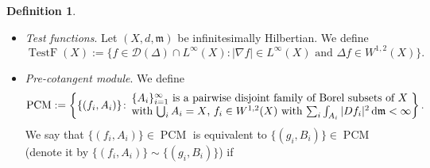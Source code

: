 \documentclass[pdftex]{sigma}
\numberwithin{equation}{section}
\theoremstyle{definition}
\newtheorem{Def}[Thm]{Definition}
\newcommand{\PCM}{\operatorname{PCM}}
\newcommand{\TestF}{\operatorname{TestF}}
\newcommand{\Ch}{\operatorname{Ch}}
\newcommand{\R}{\mathbb{R}}
\newcommand{\mf}{\mathfrak{m}}
\newcommand{\D}{\mathcal{D}}
\begin{document}
\begin{Def}
\begin{itemize}
\begin{itemize}
\[
\int_X g P_t f\,{\rm d}\mf=\int_X f P_t g\,{\rm d}\mf
\]
for any $f,g\in L^2(X)$.
\item For each $s,t>0$, we have $P_{s+t}=P_s\circ P_t$.
\item For each $f\in \D(\Delta)$ and $s>0$, we have that
\[
\lim_{t\to 0+} \frac{P_t f-f}{t}=\Delta f
\]
in $L^2(X)$ and that $\Delta P_s f =P_s \Delta f$.
\item For each $t>0$, $c\in \R$ and $f\in L^2(X)$ with $f\leq c$ $\mf$-a.e.\ in $X$, we have $P_t f\leq c$ $\mf$-a.e.\ in $X$.
\item For each $t>0$, $p\in [1,\infty)$ and $f\in L^2(X)\cap L^p(X)$, we have $\|P_t f\|_{L^p}\leq \|f\|_{L^p}$.
In~particular, we can extend the map $P_t\colon L^2(X)\cap L^p(X)\to L^2(X)\cap L^p(X)$ to~$P_t$: $L^p(X)\to L^p(X)$.
\end{itemize}
We can also show the following properties by the above properties:
\begin{itemize}\itemsep=0pt
\item For each $f\in W^{1,2}(X)$, we have $\Ch(P_t f-f)\to 0$ as $t\to 0$. Indeed, the properties $\Ch(P_t f)\leq \Ch(f)$ and $P_t f\to f$ in $L^2$ as $t\to 0$ imply that $P_t f$ converges to $f$ weakly in~$W^{1,2}$, and so $\limsup\limits_{t\to 0}\Ch(P_t f)\leq \Ch(f)$ implies that $P_t f$ converges to $f$ strongly in~$W^{1,2}$ as~$t\to 0$.
\item For each $p\in [1,\infty)$ and $f\in L^p(X)$, we have $\|P_t f-f\|_{L^p}\to 0$ as $t\to 0$. This can be verified by applying the above properties to the truncated function $f_1=\max\{\min\{f,c\},-c\}$ for a sufficiently large constant \mbox{$c\!>\!0$} and its remaining part~\mbox{$f\!-\!f_1$}.
\end{itemize}
\item \emph{Test functions}. Let $(X,d,\mf)$ be infinitesimally Hilbertian. We define
\[
\TestF(X):=\big\{f\in\D(\Delta)\cap L^\infty(X)\colon |\nabla f|\in L^\infty(X)\text{ and }\Delta f\in W^{1,2}(X)\big\} .
\]
\item \emph{Pre-cotangent module}. We define
\[
\PCM:=\left\{\{(f_i,A_i)\}\colon\,
\begin{array}{@{}l@{}}\text{$\{A_i\}_{i=1}^\infty$ is a pairwise disjoint family of Borel subsets of $X$}\\
\text{with $\bigcup_{i} A_i=X$, $f_i\in W^{1,2}(X)$ with $\sum_{i} \int_{A_i} |D f_i|^2\,{\rm d}\mf<\infty$}
\end{array}
\right\}.
\]
We say that $\{(f_i,A_i)\}\in \PCM$ is equivalent to $\{(g_i,B_i)\}\in \PCM$ (denote it by $\{(f_i,A_i)\}\sim\{(g_i,B_i)\}$) if

\end{itemize}
\end{Def}
\end{document}
